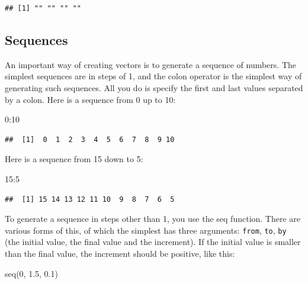 \documentclass[
]{book}
\newenvironment{Shaded}{\begin{snugshade}}{\end{snugshade}}
\newcommand{\DecValTok}[1]{\textcolor[rgb]{0.00,0.00,0.81}{#1}}
\newcommand{\FloatTok}[1]{\textcolor[rgb]{0.00,0.00,0.81}{#1}}
\newcommand{\FunctionTok}[1]{\textcolor[rgb]{0.00,0.00,0.00}{#1}}
\newcommand{\NormalTok}[1]{#1}
\newcommand{\SpecialCharTok}[1]{\textcolor[rgb]{0.00,0.00,0.00}{#1}}
\theoremstyle{definition}
\theoremstyle{definition}
\theoremstyle{definition}
\theoremstyle{definition}
\theoremstyle{remark}
\begin{document}
\begin{verbatim}
## [1] "" "" "" ""
\end{verbatim}

\hypertarget{sequences}{%
\subsection{Sequences}\label{sequences}}

An important way of creating vectors is to generate a sequence of numbers. The simplest sequences are in steps of 1, and the colon operator is the simplest way of generating such sequences. All you do is specify the first and last values separated by a colon. Here is a sequence from 0 up to 10:

\begin{Shaded}
\begin{Highlighting}[]
\DecValTok{0}\SpecialCharTok{:}\DecValTok{10}
\end{Highlighting}
\end{Shaded}

\begin{verbatim}
##  [1]  0  1  2  3  4  5  6  7  8  9 10
\end{verbatim}

Here is a sequence from 15 down to 5:

\begin{Shaded}
\begin{Highlighting}[]
\DecValTok{15}\SpecialCharTok{:}\DecValTok{5}
\end{Highlighting}
\end{Shaded}

\begin{verbatim}
##  [1] 15 14 13 12 11 10  9  8  7  6  5
\end{verbatim}

To generate a sequence in steps other than 1, you use the seq function. There are various forms of this, of which the simplest has three arguments: \texttt{from}, \texttt{to}, \texttt{by} (the initial value, the final value and the increment). If the initial value is smaller than the final value, the increment should be positive, like this:

\begin{Shaded}
\begin{Highlighting}[]
\FunctionTok{seq}\NormalTok{(}\DecValTok{0}\NormalTok{, }\FloatTok{1.5}\NormalTok{, }\FloatTok{0.1}\NormalTok{)}
\end{Highlighting}
\end{Shaded}
\end{document}
